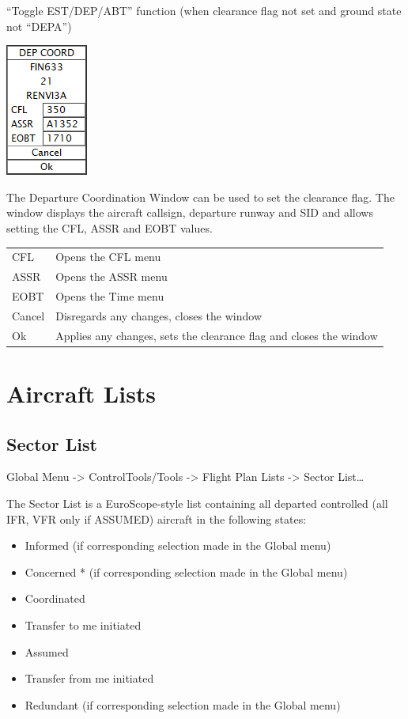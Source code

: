 \documentclass[11pt,a4paper,oldfontcommands]{memoir}
\begin{document}
“Toggle EST/DEP/ABT” function (when clearance flag not set and ground state not “DEPA”)

\includegraphics{img/dcw.png}

The Departure Coordination Window can be used to set the clearance flag. The window displays the aircraft callsign, departure runway and SID and allows setting the CFL, ASSR and EOBT values.

\begin{tabular}{l l}
    CFL     & Opens the CFL menu\\
    ASSR    & Opens the ASSR menu\\
    EOBT    & Opens the Time menu\\
    Cancel  & Disregards any changes, closes the window\\
    Ok      & Applies any changes, sets the clearance flag and closes the window\\
\end{tabular}

\section{Aircraft Lists}

\subsection{Sector List}
\label{list:sector}

Global Menu -> ControlTools/Tools -> Flight Plan Lists -> Sector List…

The Sector List is a EuroScope-style list containing all departed controlled (all IFR, VFR only if ASSUMED) aircraft in the following states:

\begin{itemize}
    \item Informed (if corresponding selection made in the Global menu)
    \item Concerned * (if corresponding selection made in the Global menu)
    \item Coordinated
    \item Transfer to me initiated
    \item Assumed
    \item Transfer from me initiated
    \item Redundant (if corresponding selection made in the Global menu)
\end{itemize}
\end{document}
